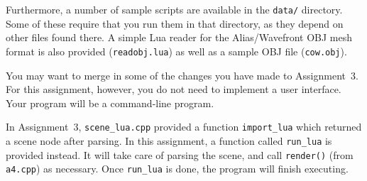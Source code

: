 Furthermore, a number of sample scripts are available in the
\texttt{data/} directory. Some of these require that you run them in
that directory, as they depend on other files found there. A simple
Lua reader for the Alias/Wavefront OBJ mesh format is also provided
(\texttt{readobj.lua}) as well as a sample OBJ file (\texttt{cow.obj}).

You may want to merge in some of the changes you have made to
Assignment~3. For this assignment, however, you do not need to
implement a user interface. Your program will be a command-line
program.

In Assignment~3, \texttt{scene\_lua.cpp} provided a function
\texttt{import\_lua} which returned a scene node after parsing. In
this assignment, a function called \texttt{run\_lua} is provided
instead. It will take care of parsing the scene, and call
\texttt{render()} (from \texttt{a4.cpp}) as necessary. Once
\texttt{run\_lua} is done, the program will finish executing.

